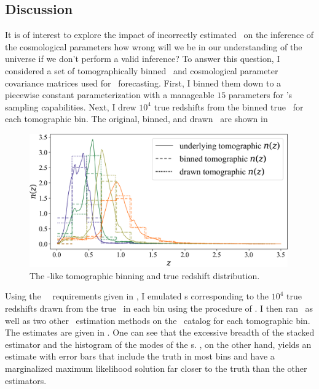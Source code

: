 \subsection{Discussion}

It is of interest to explore the impact of incorrectly estimated \nz\ on the inference of the cosmological parameters \textemdash how wrong will we be in our understanding of the universe if we don't perform a valid inference?
To answer this question, I considered a set of tomographically binned \nz\ and cosmological parameter covariance matrices used for \desc\ forecasting.
First, I binned them down to a piecewise constant parameterization with a manageable $15$ parameters for \chippr's sampling capabilities.
Next, I drew $10^{4}$ true redshifts from the binned true \nz\ for each tomographic bin.
The original, binned, and drawn \nz\ are shown in 

\begin{figure}
	\begin{center}
		\includegraphics[width=0.99\textwidth]{figures/chippr/cosmolike_inputs.png}
		\caption{The \lsst-like tomographic binning and true redshift distribution.}
	\end{center}
\end{figure}

Using the \lsst\ \pz\ requirements given in , I emulated \pzpdf s corresponding to the $10^{4}$ true redshifts drawn from the true \nz\ in each bin using the procedure of .
I then ran \chippr\ as well as two other \nz\ estimation methods on the \pzpdf\ catalog for each tomographic bin.
The estimates are given in .
One can see that the excessive breadth of the stacked estimator and the histogram of the modes of the \pzpdf s.
\Chippr, on the other hand, yields an estimate with error bars that include the truth in most bins and have a marginalized maximum likelihood solution far closer to the truth than the other estimators.

